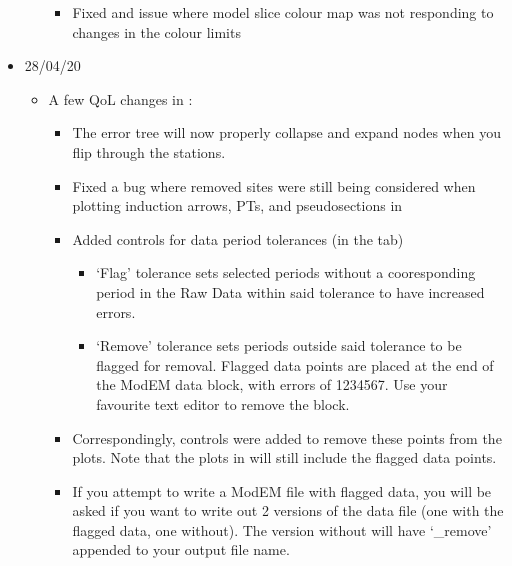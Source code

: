 \documentclass[letterpaper,10pt,english]{sphinxmanual}
\begin{document}
\begin{itemize}
\begin{itemize}
\begin{itemize}
\item {} 
Fixed and issue where model slice colour map was not responding to changes in the colour limits

\end{itemize}

\end{itemize}

\item {} 
28/04/20
\begin{itemize}
\item {} 
A few QoL changes in {\hyperref[\detokenize{content/data_plot/main_window:data-plot}]{}}:
\begin{itemize}
\item {} 
The error tree will now properly collapse and expand nodes when you flip through the stations.

\item {} 
Fixed a bug where removed sites were still being considered when plotting induction arrows, PTs, and pseudosections in {\hyperref[\detokenize{content/data_plot/map_viewer:map-viewer}]{}}

\item {} 
Added controls for data period tolerances (in the {\hyperref[\detokenize{content/data_plot/main_window:error-manipulations}]{}} tab)
\begin{itemize}
\item {} 
‘Flag’ tolerance sets selected periods without a cooresponding period in the Raw Data within said tolerance to have increased errors.

\item {} 
‘Remove’ tolerance sets periods outside said tolerance to be flagged for removal. Flagged data points are placed at the end of the ModEM data block, with errors of 1234567. Use your favourite text editor to remove the block.

\end{itemize}

\item {} 
Correspondingly, controls were added to remove these points from the plots. Note that the plots in {\hyperref[\detokenize{content/data_plot/map_viewer:map-viewer}]{}} will still include the flagged data points.

\item {} 
If you attempt to write a ModEM file with flagged data, you will be asked if you want to write out 2 versions of the data file (one with the flagged data, one without). The version without will have ‘\_remove’ appended to your output file name.


\end{itemize}
\end{itemize}
\end{itemize}
\end{document}
